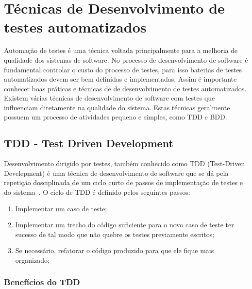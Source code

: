 \begin{enumerate}
\end{enumerate}

\section{Técnicas de Desenvolvimento de testes automatizados}

Automação de testes é uma técnica voltada principalmente para a melhoria de qualidade dos sistemas de software. 
%
No processo de desenvolvimento de software é fundamental controlar o custo do processo de testes, para isso baterias de testes automatizados devem ser bem definidas e implementadas. Assim é importante conhecer boas práticas e técnicas de de desenvolvimento de testes automatizados.    
%
Existem várias técnicas de desenvolvimento de software com testes que influenciam diretamente na qualidade do sistema. Estas técnicas geralmente possuem um processo de atividades pequeno e simples, como TDD e BDD.

\subsection{TDD - Test Driven Development}

Desenvolvimento dirigido por testes, também conhecido como TDD (Test-Driven Develepment) é uma técnica de desenvolvimento de software que se dá pela repetição dosciplinada de um ciclo curto de passos de implementação de testes e do sistema~\cite{koskela2007}.
%
O ciclo de TDD é definido pelos seguintes passos:
%
\begin{enumerate}
\item Implementar um caso de teste;
\item Implementar um trecho do código suficiente para o novo caso de teste ter sucesso de tal modo que não quebre os testes previamente escritos;
\item Se necessário, refatorar o código produzido para que ele fique mais organizado;
\end{enumerate}
%

\subsubsection {Benefícios do TDD}

